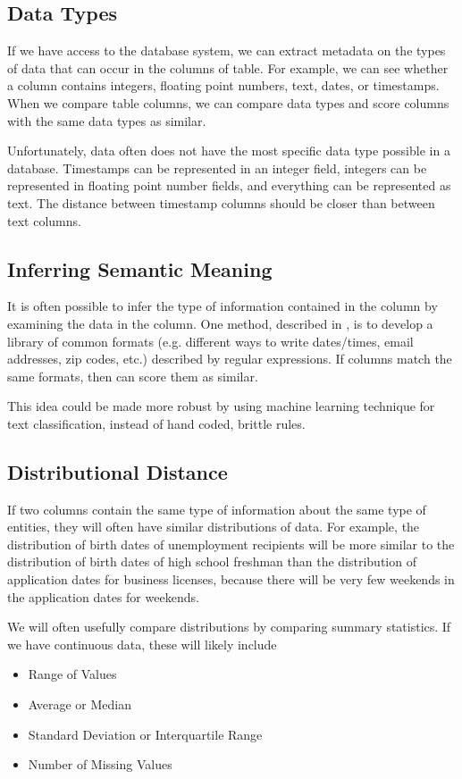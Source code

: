 \documentclass{datamade}
\theoremstyle{definition}
\theoremstyle{remark}
\begin{document}
\subsection*{Data Types}
If we have access to the database system, we can extract metadata on
the types of data that can occur in the columns of table. For example,
we can see whether a column contains integers, floating point numbers,
text, dates, or timestamps. When we compare table columns, we can
compare data types and score columns with the same data types as
similar.

Unfortunately, data often does not have the most specific data type
possible in a database. Timestamps can be represented in
an integer field, integers can be represented in floating point number
fields, and everything can be represented as text. The distance
between timestamp columns should be closer than between text
columns.

\subsection*{Inferring Semantic Meaning}
It is often possible to infer the type of information contained in the
column by examining the data in the column. One method,
described in \cite{regex}, is to develop a library of common formats
(e.g. different ways to write dates/times, email addresses, zip codes,
etc.) described by regular expressions. If columns match the same
formats, then can score them as similar.

This idea could be made more robust by using machine learning
technique for text classification, instead of hand coded, brittle rules.

\subsection*{Distributional Distance}
If two columns contain the same type of information about the same
type of entities, they will often have similar distributions of
data. For example, the distribution of birth dates of unemployment
recipients will be more similar to the distribution of birth dates of
high school freshman than the distribution of application dates for
business licenses, because there will be very few weekends in the
application dates for weekends.

We will often usefully compare distributions by comparing summary
statistics. If we have continuous data, these will likely include

\begin{itemize}
\item Range of Values
\item Average or Median
\item Standard Deviation or Interquartile Range
\item Number of Missing Values
\end{itemize}
\end{document}
